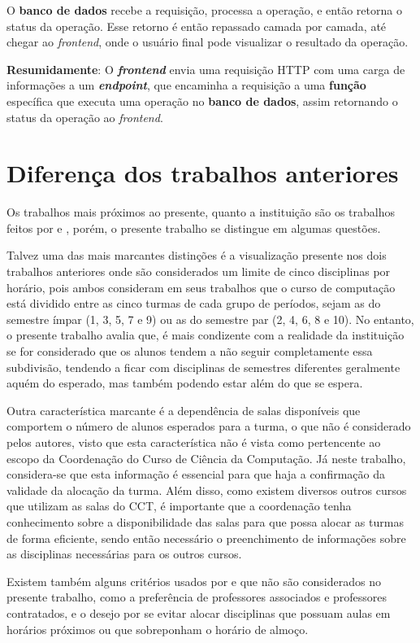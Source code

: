 O \textbf{banco de dados} recebe a requisição, processa a operação, e então retorna o status da operação. Esse retorno é então repassado camada por camada, até chegar ao \textit{frontend}, onde o usuário final pode visualizar o resultado da operação.

\textbf{Resumidamente}: O \textbf{\textit{frontend}} envia uma requisição HTTP com uma carga de informações a um \textbf{\textit{endpoint}}, que encaminha a requisição a uma \textbf{função} específica que executa uma operação no \textbf{banco de dados}, assim retornando o status da operação ao \textit{frontend}.

\section{Diferença dos trabalhos anteriores} \label{sec:diferenca} %

Os trabalhos mais próximos ao presente, quanto a instituição são os trabalhos feitos por  e , porém, o presente trabalho se distingue em algumas questões.

Talvez uma das mais marcantes distinções é a visualização presente nos dois trabalhos anteriores onde são considerados um limite de cinco disciplinas por horário, pois ambos consideram em seus trabalhos que o curso de computação está dividido entre as cinco turmas de cada grupo de períodos, sejam as do semestre ímpar (1, 3, 5, 7 e 9) ou as do semestre par (2, 4, 6, 8 e 10). No entanto, o presente trabalho avalia que, é mais condizente com a realidade da instituição se for considerado que os alunos tendem a não seguir completamente essa subdivisão, tendendo a ficar com disciplinas de semestres diferentes geralmente aquém do esperado, mas também podendo estar além do que se espera.

Outra característica marcante é a dependência de salas disponíveis que comportem o número de alunos esperados para a turma, o que não é considerado pelos autores, visto que esta característica não é vista como pertencente ao escopo da Coordenação do Curso de Ciência da Computação. Já neste trabalho, considera-se que esta informação é essencial para que haja a confirmação da validade da alocação da turma. Além disso, como existem diversos outros cursos que utilizam as salas do CCT, é importante que a coordenação tenha conhecimento sobre a disponibilidade das salas para que possa alocar as turmas de forma eficiente, sendo então necessário o preenchimento de informações sobre as disciplinas necessárias para os outros cursos.

Existem também alguns critérios usados por  e  que não são considerados no presente trabalho, como a preferência de professores associados e professores contratados, e o desejo por se evitar alocar disciplinas que possuam aulas em horários próximos ou que sobreponham o horário de almoço.
